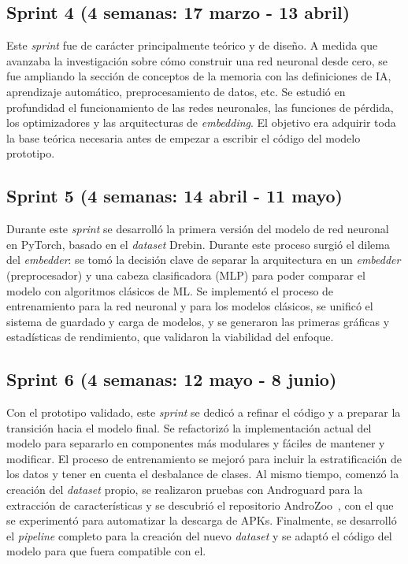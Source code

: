 \subsection{Sprint 4 (4 semanas: 17 marzo - 13 abril)}

Este \textit{sprint} fue de carácter principalmente teórico y de diseño. A medida que avanzaba la investigación sobre cómo construir una red neuronal desde cero, se fue ampliando la sección de conceptos de la memoria con las definiciones de IA, aprendizaje automático, preprocesamiento de datos, etc. Se estudió en profundidad el funcionamiento de las redes neuronales, las funciones de pérdida, los optimizadores y las arquitecturas de \textit{embedding}. El objetivo era adquirir toda la base teórica necesaria antes de empezar a escribir el código del modelo prototipo.

\subsection{Sprint 5 (4 semanas: 14 abril - 11 mayo)}

Durante este \textit{sprint} se desarrolló la primera versión del modelo de red neuronal en PyTorch, basado en el \textit{dataset} Drebin. Durante este proceso surgió el dilema del \textit{embedder}: se tomó la decisión clave de separar la arquitectura en un \textit{embedder} (preprocesador) y una cabeza clasificadora (MLP) para poder comparar el modelo con algoritmos clásicos de ML. Se implementó el proceso de entrenamiento para la red neuronal y para los modelos clásicos, se unificó el sistema de guardado y carga de modelos, y se generaron las primeras gráficas y estadísticas de rendimiento, que validaron la viabilidad del enfoque.

\subsection{Sprint 6 (4 semanas: 12 mayo - 8 junio)}

Con el prototipo validado, este \textit{sprint} se dedicó a refinar el código y a preparar la transición hacia el modelo final. Se refactorizó la implementación actual del modelo para separarlo en componentes más modulares y fáciles de mantener y modificar. El proceso de entrenamiento se mejoró para incluir la estratificación de los datos y tener en cuenta el desbalance de clases. Al mismo tiempo, comenzó la creación del \textit{dataset} propio, se realizaron pruebas con Androguard para la extracción de características y se descubrió el repositorio AndroZoo~\cite{Allix:2016:ACM:2901739.2903508}, con el que se experimentó para automatizar la descarga de APKs. Finalmente, se desarrolló el \textit{pipeline} completo para la creación del nuevo \textit{dataset} y se adaptó el código del modelo para que fuera compatible con el.

